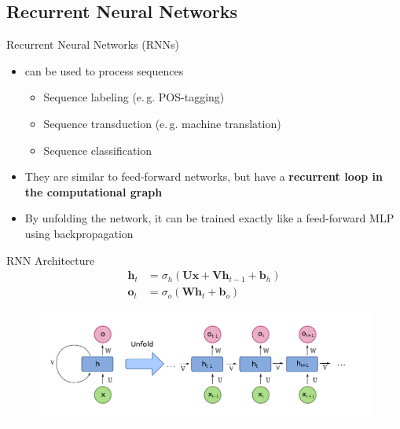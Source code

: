 \subsection{Recurrent Neural Networks}

\begin{frame}{Recurrent Neural Networks (RNNs)}{}
	\begin{itemize}
		\item {} can be used to process sequences
		\begin{itemize}
			\item Sequence labeling (e.\,g. POS-tagging)
			\item Sequence transduction (e.\,g. machine translation)
			\item Sequence classification
		\end{itemize}
		\item They are similar to feed-forward networks, but have a \textbf{recurrent loop in the computational graph}
		\item By unfolding the network, it can be trained exactly like a feed-forward MLP using backpropagation
	\end{itemize}
\end{frame}


\begin{frame}{RNN Architecture}{}
	\begin{align*}
		\bm{h}_t &= \sigma_h(\bm{U} \bm{x} + \bm{V} \bm{h}_{t - 1} + \bm{b}_h) \\
		\bm{o}_t &= \sigma_o(\bm{W} \bm{h}_t + \bm{b}_o)
	\end{align*}

	\vspace*{-2mm}
	\begin{figure}
		\centering
		\includegraphics[scale=0.35]{10_deep_learning/02_img/rnn}
	\end{figure}
\end{frame}


